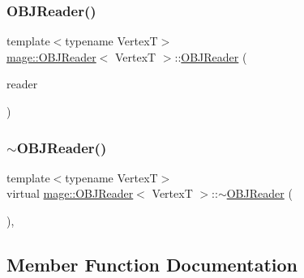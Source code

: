 \subsubsection{\texorpdfstring{O\+B\+J\+Reader()}{OBJReader()}\hspace{0.1cm}{\footnotesize\ttfamily [3/3]}}
{\footnotesize\ttfamily template$<$typename VertexT$>$ \\
\hyperlink{classmage_1_1_o_b_j_reader}{mage\+::\+O\+B\+J\+Reader}$<$ VertexT $>$\+::\hyperlink{classmage_1_1_o_b_j_reader}{O\+B\+J\+Reader} (\begin{DoxyParamCaption}\item[{\hyperlink{classmage_1_1_o_b_j_reader}{O\+B\+J\+Reader}$<$ VertexT $>$ \&\&}]{reader }\end{DoxyParamCaption})\hspace{0.3cm}{\ttfamily [delete]}}

\hypertarget{classmage_1_1_o_b_j_reader_ad6087ff608be5a45559957a076f910e2}{}\label{classmage_1_1_o_b_j_reader_ad6087ff608be5a45559957a076f910e2} 
\subsubsection{\texorpdfstring{$\sim$\+O\+B\+J\+Reader()}{~OBJReader()}}
{\footnotesize\ttfamily template$<$typename VertexT$>$ \\
virtual \hyperlink{classmage_1_1_o_b_j_reader}{mage\+::\+O\+B\+J\+Reader}$<$ VertexT $>$\+::$\sim$\hyperlink{classmage_1_1_o_b_j_reader}{O\+B\+J\+Reader} (\begin{DoxyParamCaption}{ }\end{DoxyParamCaption})\hspace{0.3cm}{\ttfamily [virtual]}, {\ttfamily [default]}}



\subsection{Member Function Documentation}
\hypertarget{classmage_1_1_o_b_j_reader_aa899d5657f913d488cc748fd49ccee60}{}\label{classmage_1_1_o_b_j_reader_aa899d5657f913d488cc748fd49ccee60} 

